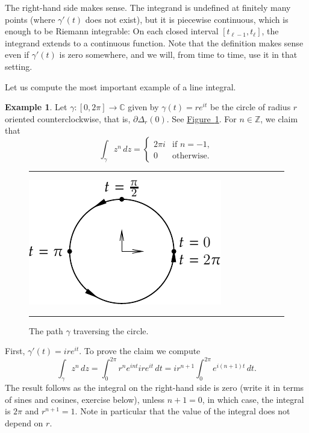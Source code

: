 \documentclass[12pt,openany]{book}
\newcommand{\C}{{\mathbb{C}}}
\newcommand{\Z}{{\mathbb{Z}}}
\theoremstyle{plain}
\theoremstyle{remark}
\theoremstyle{definition}
\newenvironment{myfig}{%
\begin{figure}[h!t]
\noindent\rule{\textwidth}{0.5pt}\vspace{12pt}\par\centering}%
{\par\noindent\rule{\textwidth}{0.5pt}
\end{figure}}
\theoremstyle{exercise}
\theoremstyle{example}
\newtheorem{example}[thm]{Example}
\newcommand{\figureref}[1]{\hyperref[#1]{Figure~\ref*{#1}}}
\begin{document}
The right-hand side makes sense.
The integrand is undefined
at finitely many points (where $\gamma'(t)$ does not exist),
but it is piecewise continuous, which is enough
to be Riemann integrable: On each closed interval
$[t_{\ell-1},t_\ell]$, the integrand extends to a continuous
function.
Note that the definition makes sense even if $\gamma'(t)$ is zero somewhere,
and we will, from time to time, use it in that setting.

Let us compute the most important example of a line integral.

\begin{example} \label{example:integralpowerz}
Let $\gamma \colon [0,2\pi] \to \C$ given by $\gamma(t) = r e^{it}$ be
the circle of radius $r$ oriented counterclockwise,
that is, $\partial \Delta_r(0)$.  See \figureref{fig:circlepath}.
For $n \in \Z$, we claim that
\begin{equation*}
\int_\gamma z^n \, dz
=
\begin{cases}
2\pi i & \text{if } n=-1, \\
0 & \text{otherwise.}
\end{cases}
\end{equation*}

\begin{myfig}
\includegraphics{figures/circlepath}
\caption{The path $\gamma$ traversing the circle.\label{fig:circlepath}}
\end{myfig}

First, $\gamma'(t) = i r e^{it}$.
To prove the claim we compute
\begin{equation*}
\int_\gamma z^n \, dz
=
\int_0^{2\pi}
r^n
e^{int} i r e^{it} \, dt
=
i r^{n+1}
\int_0^{2\pi}
e^{i(n+1)t} \, dt .
\end{equation*}
The result follows as the integral on the right-hand side is zero
(write it in terms of sines and cosines, exercise below), unless $n+1 = 0$,
in which case, the integral 
is $2\pi$ and $r^{n+1} = 1$.  Note in particular that the value of the
integral does not depend on $r$.
\end{example}
\end{document}
